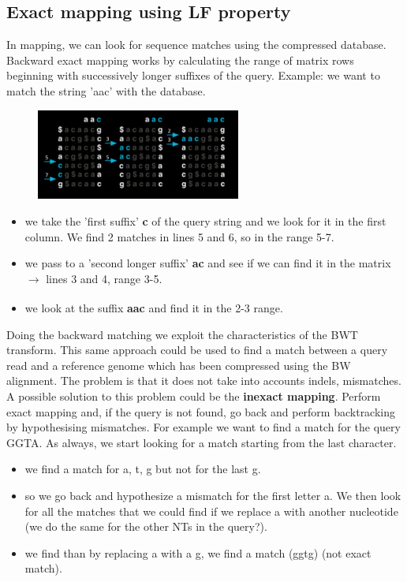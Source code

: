\subsection{Exact mapping using LF property}

In mapping, we can look for sequence matches using the compressed database.
Backward exact mapping works by calculating the range of matrix rows beginning with successively longer suffixes of the query.
Example: we want to match the string 'aac' with the database.

\begin{figure}[h]
\centering
\includegraphics[width=0.6\textwidth]{3LF.png}
\caption{}
\end{figure}

\begin{itemize}
    \item we take the 'first suffix' \textbf{c} of the query string and we look for it in the first column. We find 2 matches in lines 5 and 6, so in the range 5-7.
    \item we pass to a 'second longer suffix' \textbf{ac} and see if we can find it in the matrix $\xrightarrow[]{}$ lines 3 and 4, range 3-5.
    \item we look at the suffix \textbf{aac} and find it in the 2-3 range.
\end{itemize}

Doing the backward matching we exploit the characteristics of the BWT transform. This same approach could be used to find a match between a query read and a reference genome which has been compressed using the BW alignment.
The problem is that it does not take into accounts indels, mismatches. 
A possible solution to this problem could be the \textbf{inexact mapping}. 
Perform exact mapping and, if the query is not found, go back and perform backtracking by hypothesising mismatches. For example we want to find a match for the query GGTA. As always, we start looking for a match starting from the last character.

\begin{itemize}
    \item we find a match for a, t, g but not for the last g. 
    \item so we go back and hypothesize a mismatch for the first letter a. We then look for all the matches that we could find if we replace a with another nucleotide (we do the same for the other NTs in the query?). 
    \item we find than by replacing a with a g, we find a match (ggtg) (not exact match).
\end{itemize}

